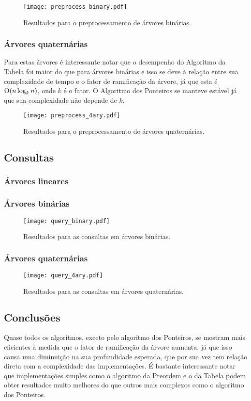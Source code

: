 \begin{figure}
  \texttt{[image: preprocess\_binary.pdf]}
  \caption{Resultados para o preprocessamento de árvores binárias.}
\end{figure}

\subsubsection{Árvores quaternárias}
Para estas árvores é interessante notar que o desempenho do Algoritmo da Tabela foi
maior do que para árvores binárias e isso se deve à relação entre sua complexidade
de tempo e o fator de ramificação da árvore, já que esta é $\mathrm{O}(n \log_k n)$, onde
$k$ é o fator. O Algoritmo dos Ponteiros se manteve estável já que sua complexidade
não depende de $k$.

\begin{figure}[H]
  \texttt{[image: preprocess\_4ary.pdf]}
  \caption{Resultados para o preprocessamento de árvores quaternárias.}
\end{figure}

\subsection{Consultas}

\subsubsection{Árvores lineares}
\subsubsection{Árvores binárias}

\begin{figure}[H]
  \texttt{[image: query\_binary.pdf]}
  \caption{Resultados para as consultas em árvores binárias.}
\end{figure}

\subsubsection{Árvores quaternárias}

\begin{figure}[H]
  \texttt{[image: query\_4ary.pdf]}
  \caption{Resultados para as consultas em árvores quaternárias.}
\end{figure}

\subsection{Conclusões}
Quase todos os algoritmos, exceto pelo algoritmo dos Ponteiros, se mostram mais
eficientes à medida que o fator de ramificação da árvore aumenta, já que isso causa
uma diminuição na sua profundidade esperada, que por sua vez tem relação direta com
a complexidade das implementações. É bastante interessante notar que implementações
simples como o algoritmo da Preordem e o da Tabela podem obter resultados muito
melhores do que outros mais complexos como o algoritmo dos Ponteiros. 